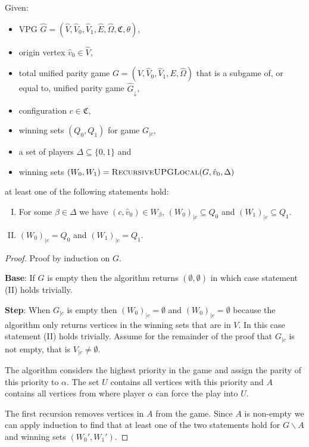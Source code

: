 \begin{theorem}
	Given:
	\begin{itemize}
		\item VPG $\hat{G} = (\hat{V}, \hat{V}_0,\hat{V}_1,\hat{E},\hat{\Omega},\mathfrak{C},\theta)$,
		\item origin vertex $\hat{v}_0 \in \hat{V}$,
		\item total unified parity game $G = (V, \hat{V}_0, \hat{V}_1,E,\hat{\Omega})$ that is a subgame of, or equal to, unified parity game $\hat{G}_{\downarrow}$,
		\item configuration $c\in \mathfrak{C}$,
		\item winning sets $(Q_0,Q_1)$ for game $G_{|c}$,
		\item a set of players $\Delta \subseteq \{0,1\}$ and
		\item winning sets $(W_0, W_1) = \textsc{RecursiveUPGLocal}(G,\hat{v}_0,\Delta)$
	\end{itemize}
	at least one of the following statements hold:
	\begin{enumerate}[(I)]
		\item For some $\beta \in \Delta$ we have $(c,\hat{v}_0) \in W_\beta$, $(W_0)_{|c} \subseteq Q_0$ and $(W_1)_{|c} \subseteq Q_1$.
		\item $(W_0)_{|c} = Q_0$ and $(W_1)_{|c} = Q_1$.
	\end{enumerate}
	\begin{proof}
		Proof by induction on $G$.
		
		\textbf{Base}: If $G$ is empty then the algorithm returns $(\emptyset,\emptyset)$ in which case statement (II) holds trivially.
		
		\textbf{Step}:
		When $G_{|c}$ is empty then $(W_0)_{|c} = \emptyset$ and $(W_0)_{|c} = \emptyset$ because the algorithm only returns vertices in the winning sets that are in $V$. In this case statement (II) holds trivially. Assume for the remainder of the proof that $G_{|c}$ is not empty, that is $V_{|c} \neq \emptyset$.
		
		The algorithm considers the highest priority in the game and assign the parity of this priority to $\alpha$. The set $U$ contains all vertices with this priority and $A$ contains all vertices from where player $\alpha$ can force the play into $U$.
		
		The first recursion removes vertices in $A$ from the game. Since $A$ is non-empty we can apply induction to find that at least one of the two statements hold for $G\backslash A$ and winning sets $(W_0',W_1')$.
		

\end{proof}
\end{theorem}
